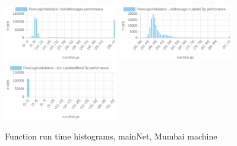 \documentclass{article}
\begin{document}
\begin{table}
	\includegraphics[width=5cm]{images/mumbai/chartPeerLogicValidation_3A_3ASendMessages.png}
	\includegraphics[width=5cm]{images/mumbai/chartPeerLogicValidation_3A_3AProcessMessages-_3EProcessMessage-_3EUpdateTip.png}	
	\includegraphics[width=5cm]{images/mumbai/chartPeerLogicValidation_3A_3AProcessMessages-_3EProcessMessage-_3EPeerLogicValidation_3A_3AUpdatedBlockTip.png}
	\caption{\label{graphsHistogramsMumbai} Function run time histograms, mainNet, Mumbai machine}
\end{table}



\end{document}
